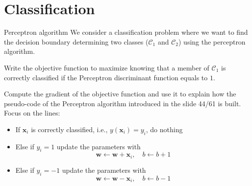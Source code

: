 \documentclass[
	ngerman,
	points=true,%
    solution=true,
    accentcolor=9c,
    colorbacktitle
	]{tudaexercise}
\begin{document}
\newpage

\section*{Classification}
\begin{task}{Perceptron algorithm}
We consider a classification problem where we want to find the decision boundary determining two classes ($\mathcal{C}_1$ and $\mathcal{C}_2$) using the perceptron algorithm.
\begin{subtask}
Write the objective function to maximize knowing that a member of $\mathcal{C}_1$ is correctly classified if the Perceptron discriminant function equals to $1$.
\end{subtask}
\begin{solution}

\end{solution}

\begin{subtask}
Compute the gradient of the objective function and use it to explain how the pseudo-code of the Perceptron algorithm introduced in the slide 44/61 is built. Focus on the lines:
\begin{itemize}
    \item If $\boldsymbol{x}_{i}$ is correctly classified, i.e., $y\left(\boldsymbol{x}_{i}\right)=y_{i}$, do nothing
    \item Else if $y_{i}=1$ update the parameters with
    $$
    \boldsymbol{w}\leftarrow\boldsymbol{w}+\boldsymbol{x}_{i},\quad b\leftarrow b+1
    $$
    \item Else if $y_{i}=-1$ update the parameters with
    $$
    \boldsymbol{w}\leftarrow\boldsymbol{w}-\boldsymbol{x}_{i},\quad b\leftarrow b-1
    $$
\end{itemize}
\end{subtask}
\begin{solution}

\end{solution}


\end{task}
\end{document}
